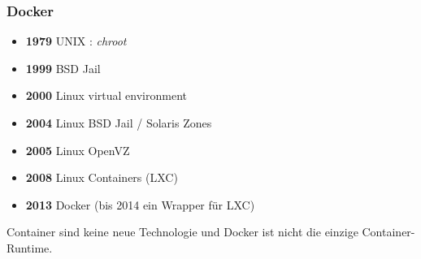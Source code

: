 \begin{frame}
\frametitle{Docker}	
\begin{itemize}
	\item \textbf{1979} UNIX : \textit{chroot}
	\item \textbf{1999} BSD Jail
	\item \textbf{2000} Linux virtual environment
	\item \textbf{2004} Linux BSD Jail / Solaris Zones
	\item \textbf{2005} Linux OpenVZ
	\item \textbf{2008} Linux Containers (LXC)
	\item \textbf{2013} Docker (bis 2014 ein Wrapper für LXC)
\end{itemize}
\pause
Container sind keine neue Technologie und Docker ist nicht die einzige Container-Runtime. 
\end{frame}